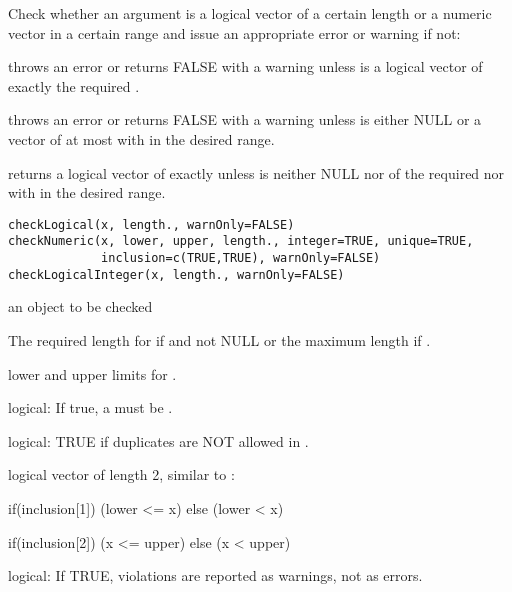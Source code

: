 \documentclass{article}
\begin{document}
\begin{Description}\relax
Check whether an argument is a logical vector of a certain length or a
numeric vector in a certain range and issue an appropriate error or
warning if not:

 throws an error or returns FALSE with a warning
unless  is a  logical vector of exactly the required
.

 throws an error or returns FALSE with a warning
unless  is either NULL or a  vector of at most
 with  in the desired range.  

 returns a logical vector of exactly
 unless  is neither NULL nor  of
the required  nor  with  in the
desired range.
\end{Description}
\begin{Usage}
\begin{verbatim}
checkLogical(x, length., warnOnly=FALSE)
checkNumeric(x, lower, upper, length., integer=TRUE, unique=TRUE,
             inclusion=c(TRUE,TRUE), warnOnly=FALSE)
checkLogicalInteger(x, length., warnOnly=FALSE)
\end{verbatim}
\end{Usage}
\begin{Arguments}
\begin{ldescription}
\item[\code{x}] an object to be checked 
\item[\code{length.}] The required length for  if  and not NULL or
the maximum length if .  

\item[\code{lower, upper}] lower and upper limits for .  

\item[\code{integer}] logical:  If true, a   must be
.  

\item[\code{unique}] logical:  TRUE if duplicates are NOT allowed in .  

\item[\code{inclusion}] logical vector of length 2, similar to
:  

if(inclusion[1]) (lower <= x) else (lower < x)

if(inclusion[2]) (x <= upper) else (x < upper)

\item[\code{warnOnly}] logical:  If TRUE, violations are reported as warnings, not as
errors.  

\end{ldescription}
\end{Arguments}
\end{document}
